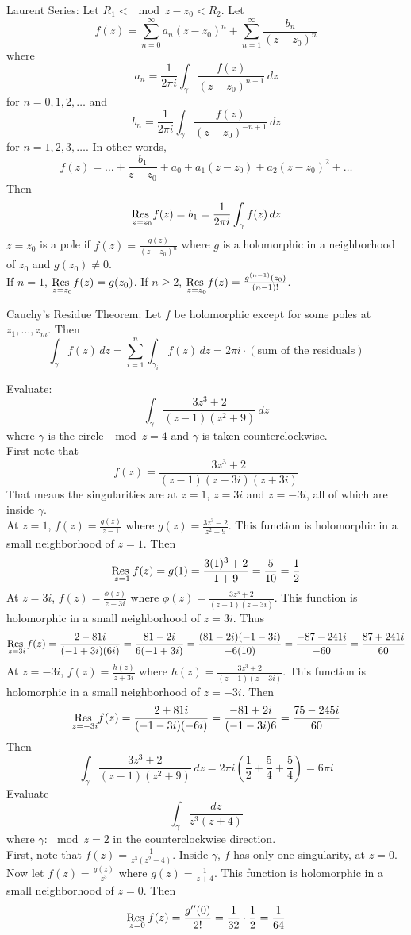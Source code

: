 \documentclass[12pt]{article}
\begin{document}
Laurent Series: Let $R_1 < \mod{z-z_0} < R_2$. Let $$f(z) = \sum_{n=0}^\infty a_n(z-z_0)^n + \sum_{n=1}^\infty \frac{b_n}{(z-z_0)^n} $$ where $$ a_n = \frac{1}{2\pi i} \int_\gamma \frac{f(z)}{(z-z_0)^{n+1}} \, dz $$ for $n=0,1,2,\dots$ and $$ b_n = \frac{1}{2\pi i} \int_\gamma \frac{f(z)}{(z-z_0)^{-n+1}} \, dz $$ for $n=1,2,3,\dots$. In other words, $$ f(z) = \dots + \frac{b_1}{z-z_0} + a_0 + a_1(z-z_0) + a_2(z-z_0)^2 + \dots $$ Then $$ \underset{z=z_0}{\text{Res }} f(z) = b_1 = \frac{1}{2\pi i} \int_\gamma f(z) \, dz $$ 
$z=z_0$ is a pole if $f(z) = \frac{g(z)}{(z-z_0)^n} $ where $g$ is a holomorphic in a neighborhood of $z_0$ and $g(z_0) \neq 0$. \\
If $n=1$, $\underset{z=z_0}{\text{Res }} f(z) = g(z_0)$. If $n \geq 2$, $\underset{z=z_0}{\text{Res }} f(z) = \frac{g^{(n-1)}(z_0)}{(n-1)!} $. 
\begin{theorem} Cauchy's Residue Theorem: Let $f$ be holomorphic except for some poles at $z_1,\dots,z_m$. Then $$\int_\gamma f(z) \, dz = \sum_{i=1}^n \int_{\gamma_i} f(z) \, dz = 2\pi i \cdot (\text{sum of the residuals}) $$ \end{theorem}
Evaluate: $$ \int_\gamma \frac{3z^3 + 2}{(z-1)(z^2 + 9)} \, dz $$ where $\gamma$ is the circle $\mod{z} = 4$ and $\gamma$ is taken counterclockwise. \\
First note that $$ f(z) = \frac{3z^3 + 2}{(z-1)(z-3i)(z+3i)} $$ That means the singularities are at $z=1$, $z=3i$ and $z=-3i$, all of which are inside $\gamma$. \\
At $z=1$, $f(z) = \frac{g(z)}{z-1}$ where $g(z) = \frac{3z^3 - 2}{z^2 + 9}$. This function is holomorphic in a small neighborhood of $z=1$. Then $$ \underset{z=1}{\text{Res }} f(z) = g(1) = \frac{3(1)^3 + 2}{1 + 9} = \frac{5}{10} = \frac{1}{2}$$ 
At $z=3i$, $f(z) = \frac{\phi(z)}{z-3i}$ where $\phi(z) = \frac{3z^3 + 2}{(z-1)(z+3i)}$. This function is holomorphic in a small neighborhood of $z=3i$. Thus $$ \underset{z=3i}{\text{Res }} f(z) = \frac{2 - 81i}{(-1+3i)(6i)} = \frac{81-2i}{6(-1 + 3i)} = \frac{(81-2i)(-1-3i)}{-6(10)} = \frac{-87-241i}{-60} = \frac{87 + 241i}{60} $$ 
At $z=-3i$, $f(z) = \frac{h(z)}{z+3i}$ where $h(z) = \frac{3z^3 + 2}{(z-1)(z-3i)}$. This function is holomorphic in a small neighborhood of $z=-3i$. Then $$ \underset{z=-3i}{\text{Res }} f(z) = \frac{2+81i}{(-1-3i)(-6i)} = \frac{-81 + 2i}{(-1-3i)6} = \frac{75 - 245i}{60} $$ 
Then $$ \int_\gamma \frac{3z^3 + 2}{(z-1)(z^2 + 9)} \, dz = 2\pi i( \frac{1}{2} + \frac{5}{4} + \frac{5}{4}) = 6\pi i $$ 
Evaluate $$ \int_\gamma \frac{dz}{z^3(z+4)} $$ where $\gamma: \mod{z} = 2$ in the counterclockwise direction. \\
First, note that $f(z) = \frac{1}{z^3(z^2 + 4)}$. Inside $\gamma$, $f$ has only one singularity, at $z=0$. Now let $f(z) = \frac{g(z)}{z^3}$ where $g(z) = \frac{1}{z+4}$. This function is holomorphic in a small neighborhood of $z=0$. Then $$ \underset{z=0}{\text{Res }} f(z) = \frac{g''(0)}{2!} = \frac{1}{32} \cdot \frac{1}{2} = \frac{1}{64} $$ 
\end{document}
